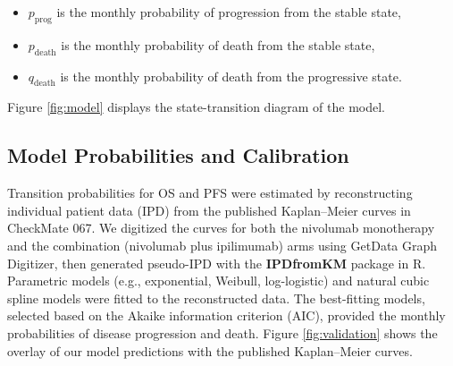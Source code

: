 \documentclass[preprint, 3p,
authoryear]{elsarticle} %
\begin{document}
\begin{itemize}
\item
  \(p_{\text{prog}}\) is the monthly probability of progression from the
  stable state,
\item
  \(p_{\text{death}}\) is the monthly probability of death from the
  stable state,
\item
  \(q_{\text{death}}\) is the monthly probability of death from the
  progressive state.
\end{itemize}

Figure \hyperref[fig:model]{\ref{fig:model}} displays the
state-transition diagram of the model.

\subsection{Model Probabilities and
Calibration}\label{model-probabilities-and-calibration}

Transition probabilities for OS and PFS were estimated by reconstructing
individual patient data (IPD) from the published Kaplan--Meier curves in
CheckMate 067. We digitized the curves for both the nivolumab
monotherapy and the combination (nivolumab plus ipilimumab) arms using
GetData Graph Digitizer, then generated pseudo-IPD with the
\textbf{IPDfromKM} package in R. Parametric models (e.g., exponential,
Weibull, log-logistic) and natural cubic spline models were fitted to
the reconstructed data. The best-fitting models, selected based on the
Akaike information criterion (AIC), provided the monthly probabilities
of disease progression and death. Figure
\hyperref[fig:validation]{\ref{fig:validation}} shows the overlay of our
model predictions with the published Kaplan--Meier curves.
\end{document}
